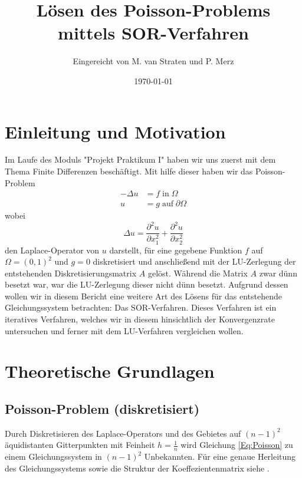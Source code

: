 \documentclass{scrartcl}
\title{Lösen des Poisson-Problems mittels SOR-Verfahren}
\author{%
  Eingereicht von M. van Straten und P. Merz
}
\date{\today}
\begin{document}
\maketitle
\tableofcontents
\cleardoublepage%

\section{Einleitung und Motivation}
Im Laufe des Moduls "Projekt Praktikum I" haben wir uns zuerst mit dem Thema
Finite Differenzen beschäftigt. Mit hilfe dieser haben wir das Poisson-Problem
\begin{align}\label{Eq:Poisson}
    -\Delta u & = f \; \text{in} \; \Omega           \\
    u         & = g \; \text{auf} \; \partial \Omega
\end{align}
wobei
\begin{equation*}
    \Delta u = \frac{\partial^2 u}{\partial x_1^2} + \frac{\partial^2 u}{\partial x_2^2}
\end{equation*}
den Laplace-Operator von \(u\) darstellt, für eine gegebene Funktion \(f\)
auf \(\Omega = {(0, 1)}^2\) und \(g = 0\) diskretisiert und anschließend mit
der LU-Zerlegung der entstehenden Diskretisierungsmatrix \(A\) gelöst. Während die Matrix \(A\) zwar dünn besetzt war,
war die LU-Zerlegung dieser nicht dünn besetzt. Aufgrund dessen wollen wir in diesem Bericht eine weitere Art des
Lösens für das entstehende Gleichungssystem betrachten: Das SOR-Verfahren. Dieses Verfahren ist ein iteratives Verfahren, welches wir in diesem hinsichtlich der Konvergenzrate untersuchen und ferner mit dem LU-Verfahren vergleichen wollen.

\section{Theoretische Grundlagen}

\subsection{Poisson-Problem (diskretisiert)}
Durch Diskretisieren des Laplace-Operators und des Gebietes auf \((n-1)^2\)
äquidistanten Gitterpunkten mit Feinheit \(h=\frac{1}{n}\) wird Gleichung \ref{Eq:Poisson} zu einem Gleichungssystem in \((n-1)^2\) Unbekannten. Für eine genaue Herleitung des Gleichungssystems sowie die Struktur der Koeffezientenmatrix siehe \cite{HandoutLU}.
\end{document}

